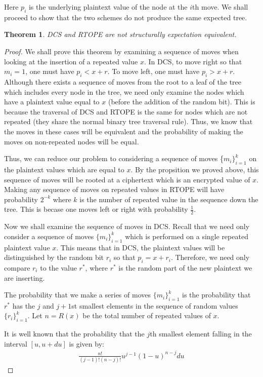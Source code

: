\documentclass[12pt]{article}
\newtheorem{theorem}{Theorem}
\begin{document}
Here $p_i$ is the underlying plaintext value of the node at the $i$th move. We shall proceed to show that the two schemes do not produce the same expected tree. \\
\begin{theorem}
    DCS and RTOPE are not structurally expectation equivalent.
  \end{theorem}
  \begin{proof}
We shall prove this theorem by examining a sequence of moves when looking at the insertion of a repeated value $x$. In DCS, to move right so that $m_i = 1$, one must have $p_i < x + r$. To move left, one must have $p_i > x + r$. Although there exists a sequence of moves from the root to a leaf of the tree which includes every node in the tree, we need only examine the nodes which have a plaintext value equal to $x$ (before the addition of the random bit). This is because the traversal of DCS and RTOPE is the same for nodes which are not repeated (they share the normal binary tree traversal rule). Thus, we know that the moves in these cases will be equivalent and the probability of making the moves on non-repeated nodes will be equal.

Thus, we can reduce our problem to considering a sequence of moves \{$m_i\}_{i=1}^k$ on the plaintext values which are equal to $x$. By the propsition we proved above, this sequence of moves will be rooted at a ciphertext which is an encrypted value of $x$. Making any sequence of moves on repeated values in RTOPE will have probability $2^{-k}$ where $k$ is the number of repeated value in the sequence down the tree. This is becase one moves left or right with probability $\frac{1}{2}$.

Now we shall examine the sequence of moves in DCS. Recall that we need only consider a sequence of moves $\{m_i\}_{i=1}^k$ which is performed on a single repeated plaintext value $x$. This means that in DCS, the plaintext values will be distinguished by the random bit $r_i$ so that $p_i = x + r_i$. Therefore, we need only compare $r_i$ to the value $r^*$, where $r^*$ is the random part of the new plaintext we are inserting.

The probability that we make a series of moves $\{m_i\}_{i=1}^k$ is the probability that $r^*$ has the $j$ and $j+1$st smallest elements in the sequence of random values $\{ r_i\}_{i=1}^k$. Let $n = R(x)$ be the total number of repeated values of $x$.

It is well known that the probability that the $j$th smallest element falling in the interval $[u, u + du]$ is given by:
    \begin{eqnarray}
      \frac{n!}{(j-1)!(n-j)!} u^{j-1} (1-u)^{n-j} du
    \end{eqnarray}


\end{proof}
\end{document}
